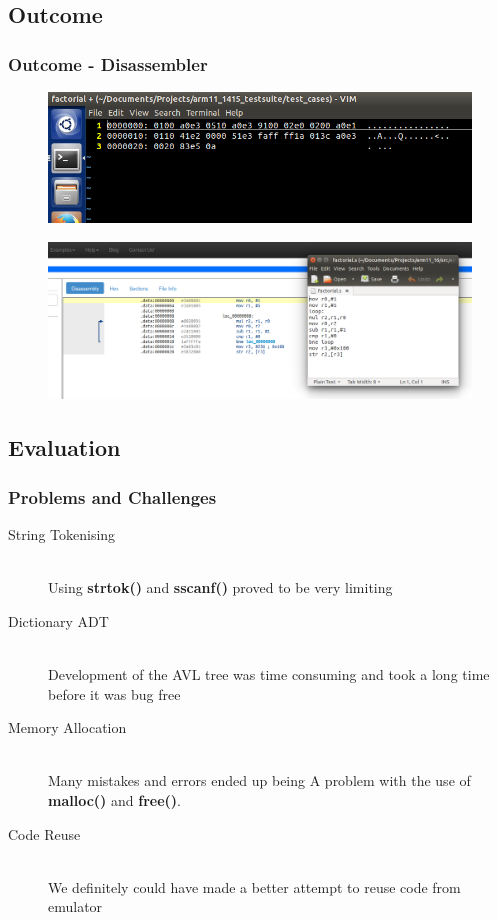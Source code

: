 \documentclass{beamer}
\begin{document}
\subsection{Outcome}
\begin{frame}[fragile] %
\frametitle{Outcome - Disassembler}

\begin{figure}
\includegraphics[width=1\linewidth]{Images/Screen1.png}
\end{figure}

\begin{figure}
\includegraphics[width=1\linewidth]{Images/Screen2.png}
\end{figure}

\end{frame}

\subsection{Evaluation}
\begin{frame}
\frametitle{Problems and Challenges}
\begin{description}
\item[String Tokenising]\hfill\\
	Using \textbf{strtok()} and \textbf{sscanf()} proved to be very limiting
	
\item[Dictionary ADT]\hfill\\
	Development of the AVL tree was time consuming and took a long time before it was bug free
	
\item[Memory Allocation]\hfill\\
	Many mistakes and errors ended up being A problem with the use of \textbf{malloc()} and \textbf{free()}.

\item[Code Reuse]\hfill\\
	We definitely could have made a better attempt to reuse code from emulator

\end{description}
\end{frame}
\end{document}
